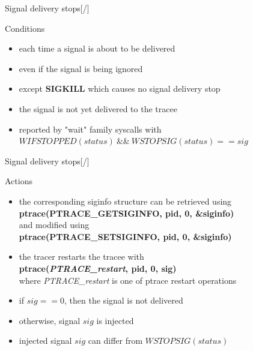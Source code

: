 \documentclass[unicode,aspectratio=169,xcolor={table,dvipsnames,usenames}]{beamer}
\begin{document}
\begin{frame}{\Large Signal delivery stops\hfill [\insertframenumber/\inserttotalframenumber]}
\Large
\begin{block}{Conditions}
\begin{itemize}
	\item each time a signal is about to be delivered
	\item even if the signal is being ignored
	\item except \textbf{SIGKILL} which causes no signal delivery stop
	\item the signal is not yet delivered to the tracee
	\item reported by "wait" family syscalls with \\
		$WIFSTOPPED(status)\ \&\&\ WSTOPSIG(status) == sig$
\end{itemize}
\end{block}
\end{frame}

\begin{frame}{\Large Signal delivery stops\hfill [\insertframenumber/\inserttotalframenumber]}
\Large
\begin{block}{Actions}
\begin{itemize}
	\item the corresponding siginfo structure can be retrieved using \\
		\textbf{ptrace(PTRACE\_GETSIGINFO, pid, 0, \&siginfo)} \\
		and modified using \\
		\textbf{ptrace(PTRACE\_SETSIGINFO, pid, 0, \&siginfo)}
	\item the tracer restarts the tracee with \\
		\textbf{ptrace(\textit{PTRACE\_restart}, pid, 0, sig)} \\
	where \textit{PTRACE\_restart} is one of ptrace restart operations
	\item if $sig == 0$, then the signal is not delivered
	\item otherwise, signal $sig$ is injected
	\item injected signal $sig$ can differ from $WSTOPSIG(status)$
\end{itemize}
\end{block}
\end{frame}
\end{document}
